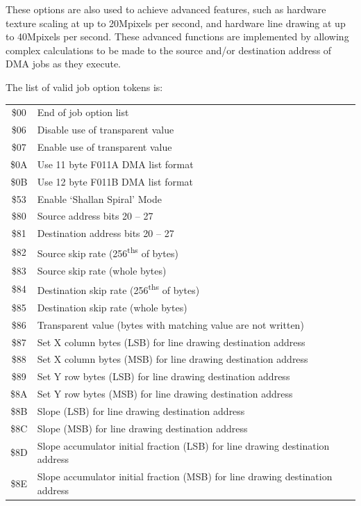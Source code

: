 These options are also used to achieve advanced features, such as hardware
texture scaling at up to 20Mpixels per second, and hardware line drawing
at up to 40Mpixels per second. These advanced functions are implemented
by allowing complex calculations to be made to the source and/or destination
address of DMA jobs as they execute.

The list of valid job option tokens is:

\begin{tabular}{|c|p{10cm}|}
  \hline
  \$00 & End of job option list \\
  \$06 & Disable use of transparent value \\
  \$07 & Enable use of transparent value \\
  \$0A & Use 11 byte F011A DMA list format \\
  \$0B & Use 12 byte F011B DMA list format \\
  \$53 & Enable `Shallan Spiral' Mode \\
  \$80 & Source address bits 20 -- 27 \\
  \$81 & Destination address bits 20 -- 27 \\
  \$82 & Source skip rate (256\textsuperscript{ths} of bytes) \\
  \$83 & Source skip rate (whole bytes) \\
  \$84 & Destination skip rate (256\textsuperscript{ths} of bytes) \\
  \$85 & Destination skip rate (whole bytes) \\
  \$86 & Transparent value (bytes with matching value are not written) \\
  \$87 & Set X column bytes (LSB) for line drawing destination address \\
  \$88 & Set X column bytes (MSB) for line drawing destination address \\
  \$89 & Set Y row bytes (LSB) for line drawing destination address \\
  \$8A & Set Y row bytes (MSB) for line drawing destination address \\
  \$8B & Slope (LSB) for line drawing destination address \\
  \$8C & Slope (MSB) for line drawing destination address \\
  \$8D & Slope accumulator initial fraction (LSB) for line drawing destination address \\
  \$8E & Slope accumulator initial fraction (MSB) for line drawing destination address \\

\end{tabular}
